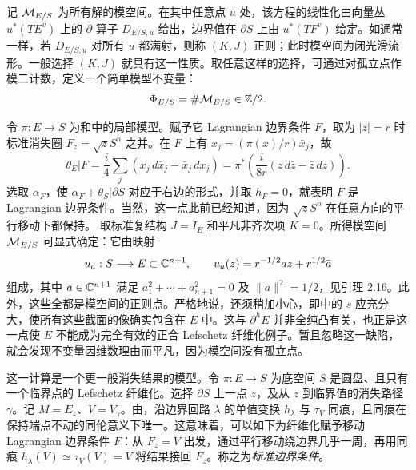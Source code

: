 记 $\mathcal M_{E/S}$ 为所有解的模空间。在其中任意点 $u$ 处，该方程的线性化由向量丛 $u^*(TE^v)$ 上的 $\bar\partial$ 算子 $D_{E/S,u}$ 给出，边界值在 $\partial S$ 上由 $u^*(TF^v)$ 给定。如通常一样，若 $D_{E/S,u}$ 对所有 $u$ 都满射，则称 $(K,J)$ 正则；此时模空间为闭光滑流形。一般选择 $(K,J)$ 就具有这一性质。取任意这样的选择，可通过对孤立点作模二计数，定义一个简单模型不变量：
\begin{equation}\label{eq:17.7}
\Phi_{E/S}=\#\mathcal M_{E/S}\in\mathbb Z/2.
\end{equation}

\clearpage
{}\begin{example}\label{st:17.3}
令 $\pi:E\to S$ 为和中的局部模型。赋予它 Lagrangian 边界条件 $F$，取为 $|z|=r$ 时标准消失圈 $F_z=\sqrt zS^n$ 之并。在 $F$ 上有 $x_j=(\pi(x)/r)\bar x_j$，故
\[
\theta_E|F=\frac i4\sum_j(x_j\,d\bar x_j-\bar x_j\,dx_j)
=\pi^*\left(\frac{i}{8r}(z\,d\bar z-\bar z\,dz)\right).
\]
选取 $\alpha_F$，使 $\alpha_F+\theta_S|\partial S$ 对应于右边的形式，并取 $h_F=0$，就表明 $F$ 是 Lagrangian 边界条件。当然，这一点此前已经知道，因为 $\sqrt zS^n$ 在任意方向的平行移动下都保持。
取标准复结构 $J=I_E$ 和平凡非齐次项 $K=0$。所得模空间 $\mathcal M_{E/S}$ 可显式确定：它由映射
\begin{equation}\label{eq:17.8}
u_a:S\longrightarrow E\subset\mathbb C^{n+1},\qquad
u_a(z)=r^{-1/2}az+r^{1/2}\bar a
\end{equation}
组成，其中 $a\in\mathbb C^{n+1}$ 满足 $a_1^2+\cdots+a_{n+1}^2=0$ 及 $\|a\|^2=1/2$，见引理 2.16。此外，这些全都是模空间的正则点。严格地说，还须稍加小心，即中的 $s$ 应充分大，使所有这些截面的像确实包含在 $E$ 中。这与 $\partial^hE$ 并非全纯凸有关，也正是这一点使 $E$ 不能成为完全有效的正合 Lefschetz 纤维化例子。暂且忽略这一缺陷，就会发现不变量因维数理由而平凡，因为模空间没有孤立点。
\end{example}

这一计算是一个更一般消失结果的模型。令 $\pi:E\to S$ 为底空间 $S$ 是圆盘、且只有一个临界点的 Lefschetz 纤维化。选择 $\partial S$ 上一点 $z$，及从 $z$ 到临界值的消失路径 $\gamma$。记 $M=E_z$、$V=V_\gamma$。由，沿边界回路 $\lambda$ 的单值变换 $h_\lambda$ 与 $\tau_V$ 同痕，且同痕在保持端点不动的同伦意义下唯一。这意味着，可以如下为纤维化赋予移动 Lagrangian 边界条件 $F$：从 $F_z=V$ 出发，通过平行移动绕边界几乎一周，再用同痕 $h_\lambda(V)\simeq\tau_V(V)=V$ 将结果接回 $F_z$。称之为\emph{标准边界条件}。

